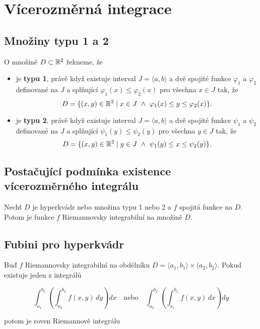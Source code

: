 \section{Vícerozměrná integrace}

\subsection*{Množiny typu 1 a 2}

O množině $D \subset \mathbb{R}^2$ řekneme, že

\begin{itemize}
    \item je \textbf{typu 1}, právě když existuje interval $J = \langle a, b \rangle$ a
          dvě spojité funkce $\varphi_1$ a $\varphi_2$ definované na $J$ a splňující
          $\varphi_1(x) \leq \varphi_2(x)$ pro všechna $x \in J$ tak, že
          \[ D = \{ (x,y) \in \mathbb{R}^2 \mid x \in J \ \wedge \ \varphi_1(x) \leq y \leq \varphi_2(x) \}. \]
    \item je \textbf{typu 2}, právě když existuje interval $J = \langle a, b \rangle$ a
          dvě spojité funkce $\psi_1$ a $\psi_2$ definované na $J$ a splňující $\psi_1(y)
              \leq \psi_2(y)$ pro všechna $y \in J$ tak, že
          \[ D = \{ (x,y) \in \mathbb{R}^2 \mid y \in J \ \wedge \ \psi_1(y) \leq x \leq \psi_2(y) \}. \]
\end{itemize}

\subsection*{Postačující podmínka existence vícerozměrného integrálu}

Nechť $D$ je hyperkvádr nebo množina typu 1 nebo 2 a $f$ spojitá funkce na $D$.
Potom je funkce $f$ Riemannovsky integrabilní na množině $D$.

\subsection*{Fubini pro hyperkvádr}

Buď $f$ Riemannovsky integrabilní na obdélníku $D = \langle a_1, b_1 \rangle
    \times \langle a_2, b_2 \rangle$. Pokud existuje jeden z integrálů

\[ \int_{a_1}^{b_1} \left( \int_{a_2}^{b_2} f(x,y)\,dy \right)dx
    \quad\text{nebo}\quad
    \int_{a_2}^{b_2} \left( \int_{a_1}^{b_1} f(x,y)\,dx \right)dy \]

\noindent potom je roven Riemannově integrálu

